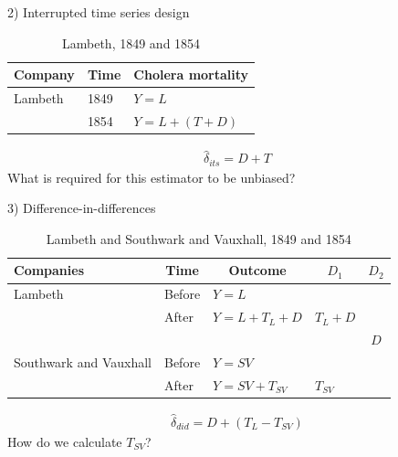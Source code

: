 \documentclass{beamer}
\begin{document}
\begin{frame}{2) Interrupted time series design}

	\begin{table}\centering
		\caption{Lambeth, 1849 and 1854}
		\begin{center}
		\begin{tabular}{lll}
		\toprule
		\multicolumn{1}{l}{\textbf{Company}}&
		\multicolumn{1}{c}{\textbf{Time}}&
		\multicolumn{1}{c}{\textbf{Cholera mortality}}\\
		\midrule
		Lambeth & 1849 & $Y=L$ \\
		& 1854 & $Y=L + (T + D)$ \\
		\bottomrule
		\end{tabular}
		\end{center}
	\end{table}

\begin{eqnarray*}
\widehat{\delta}_{its} = D + T
\end{eqnarray*}What is required for this estimator to be unbiased?


\end{frame}

\begin{frame}{3) Difference-in-differences}

\begin{table}\centering
		\caption{Lambeth and Southwark and Vauxhall, 1849 and 1854}
		\begin{center}
		\begin{tabular}{lll|lc}
		\toprule
		\multicolumn{1}{l}{\textbf{Companies}}&
		\multicolumn{1}{c}{\textbf{Time}}&
		\multicolumn{1}{c}{\textbf{Outcome}}&
		\multicolumn{1}{c}{$D_1$}&
		\multicolumn{1}{c}{$D_2$}\\
		\midrule
		Lambeth & Before & $Y=L$ \\
		& After & $Y=L + T_L + D$ & $T_L+D$\\
		\midrule
		& & & & $D$ \\
		\midrule
		Southwark and Vauxhall & Before & $Y=SV$ \\
		& After & $Y=SV + T_{SV}$ & $T_{SV}$\\
		\bottomrule
		\end{tabular}
		\end{center}
	\end{table}

\begin{eqnarray*}
\widehat{\delta}_{did} = D + (T_L - T_{SV})
\end{eqnarray*}How do we calculate $T_{SV}$?  

\end{frame}
\end{document}
